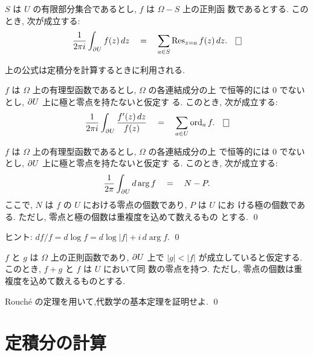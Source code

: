 \documentclass[12pt,twoside]{jarticle}
\begin{document}
\begin{question}
  $S$ は $U$ の有限部分集合であるとし, $f$ は $\Omega - S$ 上の正則函
  数であるとする. このとき, 次が成立する:
  \[%
    \frac{1}{2\pi i} \int_{\del U} f(z)\,dz
    \quad = \quad
    \sum_{a\in S} \Res_{z=a} f(z)\,dz.
  \qed
  \]%
\end{question}

\noindent 上の公式は定積分を計算するときに利用される. 

\begin{question}
  $f$ は $\Omega$ 上の有理型函数であるとし, $\Omega$ の各連結成分の上
  で恒等的には $0$ でないとし, $\partial U$ 上に極と零点を持たないと仮定す
  る. このとき, 次が成立する:
  \[%
    \frac{1}{2\pi i} \int_{\del U} \frac{f'(z)\,dz}{f(z)}
    \quad = \quad
    \sum_{a\in U} \ord_a f.
  \qed 
  \]%
\end{question}

\begin{question}[偏角の原理]
  $f$ は $\Omega$ 上の有理型函数であるとし, $\Omega$ の各連結成分の上
  で恒等的には $0$ でないとし, $\partial U$ 上に極と零点を持たないと仮定す
  る. このとき, 次が成立する:
  \[
    \frac{1}{2\pi}\int_{\partial U} d\arg f
    \quad = \quad
    N - P.
  \]
  ここで, $N$ は $f$ の $U$ における零点の個数であり, $P$ は $U$ にお
  ける極の個数である. ただし, 零点と極の個数は重複度を込めて数えるもの
  とする. \qed
\end{question}

\noindent ヒント: $df/f = d\log f = d\log|f| + i\,d\arg f$. \qed

\begin{question}
  $f$ と $g$ は $\Omega$ 上の正則函数であり, $\partial U$ 上で $|g| < |f|$
  が成立していると仮定する. このとき, $f + g$ と $f$ は $U$ において同
  数の零点を持つ. ただし, 零点の個数は重複度を込めて数えるものとする.
\end{question}

\begin{question}
  Rouch\'e の定理を用いて,代数学の基本定理を証明せよ. \qed
\end{question}


\section{定積分の計算}

\end{document}
